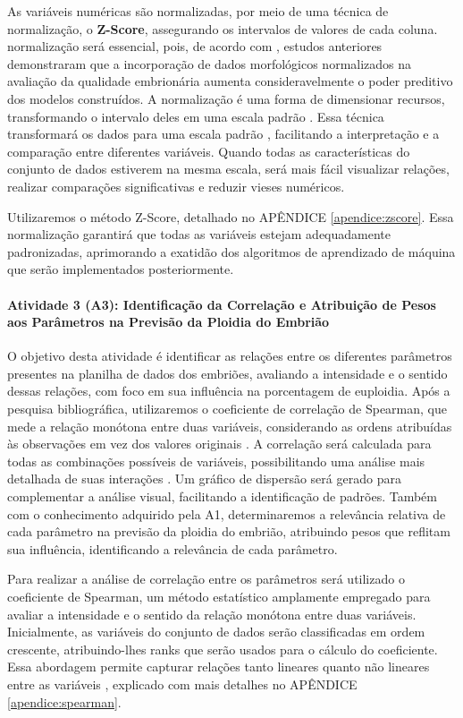 As variáveis numéricas são normalizadas, por meio de uma técnica de normalização, o \textbf{Z-Score}, assegurando os intervalos de valores de cada coluna. normalização será essencial, pois, de acordo com , estudos anteriores demonstraram que a incorporação de dados morfológicos normalizados na avaliação da qualidade embrionária aumenta consideravelmente o poder preditivo dos modelos construídos. A normalização é uma forma de dimensionar recursos, transformando o intervalo deles em uma escala padrão \cite{jaiswal2024}. Essa técnica transformará os dados para uma escala padrão \cite{jaiswal2024}, facilitando a interpretação e a comparação entre diferentes variáveis. Quando todas as características do conjunto de dados estiverem na mesma escala, será mais fácil visualizar relações, realizar comparações significativas e reduzir vieses numéricos.

Utilizaremos o método Z-Score, detalhado no APÊNDICE \ref{apendice:zscore}. Essa normalização garantirá que todas as variáveis estejam adequadamente padronizadas, aprimorando a exatidão dos algoritmos de aprendizado de máquina que serão implementados posteriormente.

\paragraph{\textbf{Atividade 3 (A3):} Identificação da Correlação e Atribuição de Pesos aos Parâmetros na Previsão da Ploidia do Embrião}

O objetivo desta atividade é identificar as relações entre os diferentes parâmetros presentes na planilha de dados dos embriões, avaliando a intensidade e o sentido dessas relações, com foco em sua influência na porcentagem de euploidia. Após a pesquisa bibliográfica, utilizaremos o coeficiente de correlação de Spearman, que mede a relação monótona entre duas variáveis, considerando as ordens atribuídas às observações em vez dos valores originais \cite{sousa2019}. A correlação será calculada para todas as combinações possíveis de variáveis, possibilitando uma análise mais detalhada de suas interações \cite{sousa2019}. Um gráfico de dispersão será gerado para complementar a análise visual, facilitando a identificação de padrões. Também com o conhecimento adquirido pela A1, determinaremos a relevância relativa de cada parâmetro na previsão da ploidia do embrião, atribuindo pesos que reflitam sua influência, identificando a relevância de cada parâmetro.

Para realizar a análise de correlação entre os parâmetros será utilizado o coeficiente de Spearman, um método estatístico amplamente empregado para avaliar a intensidade e o sentido da relação monótona entre duas variáveis. Inicialmente, as variáveis do conjunto de dados serão classificadas em ordem crescente, atribuindo-lhes ranks que serão usados para o cálculo do coeficiente. Essa abordagem permite capturar relações tanto lineares quanto não lineares entre as variáveis \cite{sousa2019}, explicado com mais detalhes no APÊNDICE \ref{apendice:spearman}. 

